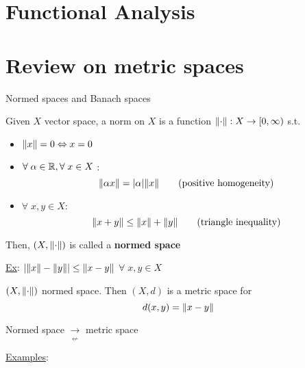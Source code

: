 \newpage
\section*{Functional Analysis}
\section{Review on metric spaces}
Normed spaces and Banach spaces
\begin{definition}
    Given \(X\) vector space, a norm on \(X\) is a function \(\norm{\cdot} : X \to [0, \infty)\) s.t.
    \begin{itemize}
        \item \(\norm{x} = 0 \Leftrightarrow x = 0\)
        \item \(\forall \; \alpha \in \mathbb{R}, \forall \; x \in X\) : 
        \[
            \norm{\alpha x} = \abs{\alpha}\norm{x}  \tag*{(positive homogeneity)}
        \]
        \item \(\forall \; x,y \in X\): 
        \[
            \norm{x+y} \leq \norm{x} + \norm{y} \tag*{(triangle inequality)}
        \]
    \end{itemize}
    Then, \((X, \norm{\cdot})\) is called a \textbf{normed space}
\end{definition}
\noindent\underline{Ex}: \(\abs{\norm{x} - \norm{y}} \leq \norm{x - y}\) \(\forall \; x,y \in X\)
\begin{proposition}
    \((X, \norm{\cdot})\) normed space. Then \((X, d)\) is a metric space for 
    \[
        d(x,y) = \norm{x - y}
    \]
\end{proposition}
\begin{remark}
    Normed space \(\underset{\displaystyle\nleftarrow}{\rightarrow}\) metric space
\end{remark}
\noindent\underline{Examples}:

